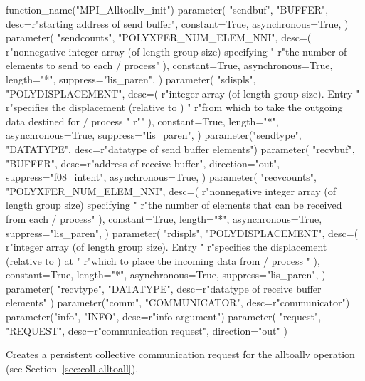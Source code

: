 \begin{mpi-binding}
    function_name("MPI_Alltoallv_init")
    parameter(
        "sendbuf",
        "BUFFER",
        desc=r"starting address of send buffer",
        constant=True,
        asynchronous=True,
    )
    parameter(
        "sendcounts",
        "POLYXFER_NUM_ELEM_NNI",
        desc=(
            r"nonnegative integer array (of length group size) specifying "
            r"the number of elements to send to each \MPI/ process"
        ),
        constant=True,
        asynchronous=True,
        length="*",
        suppress="lis_paren",
    )
    parameter(
        "sdispls",
        "POLYDISPLACEMENT",
        desc=(
            r"integer array (of length group size). Entry  "
            r"specifies the displacement (relative to ) "
            r"from which to take the outgoing data destined for \MPI/ process "
            r""
        ),
        constant=True,
        length="*",
        asynchronous=True,
        suppress="lis_paren",
    )
    parameter("sendtype", "DATATYPE", desc=r"datatype of send buffer elements")
    parameter(
        "recvbuf",
        "BUFFER",
        desc=r"address of receive buffer",
        direction="out",
        suppress="f08_intent",
        asynchronous=True,
    )
    parameter(
        "recvcounts",
        "POLYXFER_NUM_ELEM_NNI",
        desc=(
            r"nonnegative integer array (of length group size) specifying "
            r"the number of elements that can be received from each \MPI/ process"
        ),
        constant=True,
        length="*",
        asynchronous=True,
        suppress="lis_paren",
    )
    parameter(
        "rdispls",
        "POLYDISPLACEMENT",
        desc=(
            r"integer array (of length group size). Entry  "
            r"specifies the displacement (relative to ) at "
            r"which to place the incoming data from \MPI/ process "
        ),
        constant=True,
        length="*",
        asynchronous=True,
        suppress="lis_paren",
    )
    parameter(
        "recvtype", "DATATYPE", desc=r"datatype of receive buffer elements"
    )
    parameter("comm", "COMMUNICATOR", desc=r"communicator")
    parameter("info", "INFO", desc=r"info argument")
    parameter(
        "request", "REQUEST", desc=r"communication request", direction="out"
    )
\end{mpi-binding}

Creates a persistent collective communication request for the alltoallv operation
(see Section~\ref{sec:coll-alltoall}).


